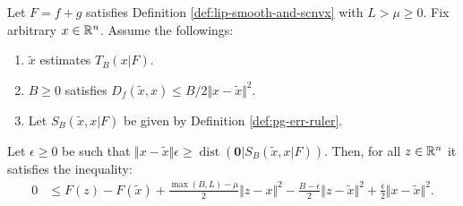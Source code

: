 \documentclass[12pt]{article}
\newcommand{\dist}{\ensuremath{\operatorname{dist}}}
\begin{document}
        \begin{lemma}\label{lemma:inex-pg-ineq}
            Let $F = f + g$ satisfies Definition \ref{def:lip-smooth-and-scnvx} with $L > \mu \ge 0$. 
            Fix arbitrary $x \in \mathbb R^n$. 
            Assume the followings: 
            \begin{enumerate}[nosep]
                \item $\tilde x$ estimates $T_B(x | F)$. 
                \item $B \ge 0$ satisfies $D_f(\tilde x, x) \le B/2\Vert x - \tilde x\Vert^2$. 
                \item Let $S_B(\tilde x, x | F)$ be given by Definition \ref{def:pg-err-ruler}. 
            \end{enumerate}
            Let $\epsilon \ge 0$ be such that $\Vert x - \tilde x\Vert\epsilon \ge \dist(\mathbf 0 |S_B(\tilde x, x | F))$.
            Then, for all $z\in \mathbb R^n$ it satisfies the inequality: 
            \begin{align*}
                0 &\le 
                F(z) - F(\tilde x) + \frac{\max(B, L) - \mu}{2}\Vert z - x\Vert^2
                - \frac{B - \epsilon}{2}\Vert z - \tilde x\Vert^2
                + \frac{\epsilon}{2}\Vert x - \tilde x \Vert^2. 
            \end{align*}
        \end{lemma}
\end{document}
